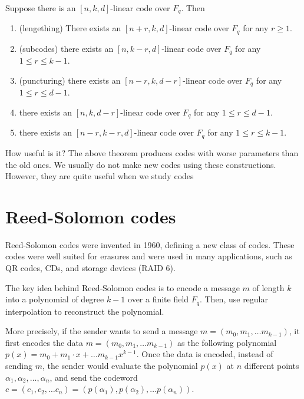\begin{theorem}
    Suppose there is an $[n, k, d]$-linear code over $F_q$. Then
    \begin{enumerate}
        \item (lengething) There exists an $[n + r, k, d]$-linear code over 
        $F_q$ for any $r \ge 1$.

        \item (subcodes) there exists an $[n, k-r, d]$-linear code over $F_q$ for any 
        $1 \le r \le k- 1$.

        \item (puncturing) there exists an $[n- r, k, d- r]$-linear code over $F_q$ for any
        $1 \le r \le d- 1$.

        \item there exists an $[n, k, d- r]$-linear code over
         $F_q$ for any $1 \le r \le d- 1$.
        
        \item there exists an $[n- r, k- r, d]$-linear code over
         $F_q$ for any $1 \le r \le k- 1$.
    \end{enumerate}
\end{theorem}

\begin{notice}{How useful is it?}
The above theorem produces codes with worse
parameters than the old ones. We usually do not make new codes using these
constructions. However, they are quite useful when we study codes
\end{notice}


\section{Reed-Solomon codes}
Reed-Solomon codes were invented in 1960, defining a new class 
of codes. These codes were well suited for erasures and were used in
many applications, such as QR codes, CDs, and storage devices (RAID 6).

The key idea behind Reed-Solomon codes is to encode a message $m$ of length $k$
into a polynomial of degree $k-1$ over a finite field $F_q$. Then, use regular interpolation 
to reconstruct the polynomial.

More precisely, if the sender wants to send a message $m=(m_0, m_1 ,\dots m_{k-1})$,
it first encodes the data $m=(m_0, m_1 ,\dots m_{k-1})$ as the following polynomial
$ p(x)=m_0 +m_1 \cdot x + \dots m_{k-1}x ^{k-1}$.
Once the data is encoded, instead of sending $m$, the sender would 
evaluate the polynomial $p(x)$ at $n$ different points $\alpha_1,\alpha_2,\dots,\alpha_n$,
and send the codeword $c=(c_1,c_2,\dots c_n) =(p(\alpha_1), p(\alpha_2),\dots p(\alpha_n))$.

